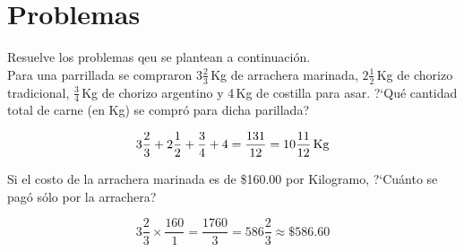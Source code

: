 \documentclass[11pt]{article}
\begin{document}
\section{Problemas}

Resuelve los problemas qeu se plantean a continuaci\'on. \\


Para una parrillada se compraron $3\frac{2}{3} $\,Kg de arrachera  marinada,
$2\frac{1}{2} $\,Kg de chorizo tradicional, $\frac{3}{4} $\,Kg de chorizo
argentino y 4\,Kg de costilla para asar. ?`Qu\'e cantidad total de carne (en Kg)
se compr\'o para dicha parillada?

\vspace{5mm}

\begin{equation*}
3\frac{2}{3} + 2\frac{1}{2} + \frac{3}{4} + 4 = \frac{131}{12} = 10\frac{11}{12}\text{\,Kg}
\end{equation*}

\vspace{5mm}


Si el costo de la arrachera marinada es de \$160.00 por Kilogramo, ?`Cu\'anto se
pag\'o s\'olo por la arrachera?

\vspace{5mm}

\begin{equation*}
3\frac{2}{3} \times \frac{160}{1} = \frac{1760}{3} = 586\frac{2}{3}  \approx \$586.60
\end{equation*}
\end{document}

